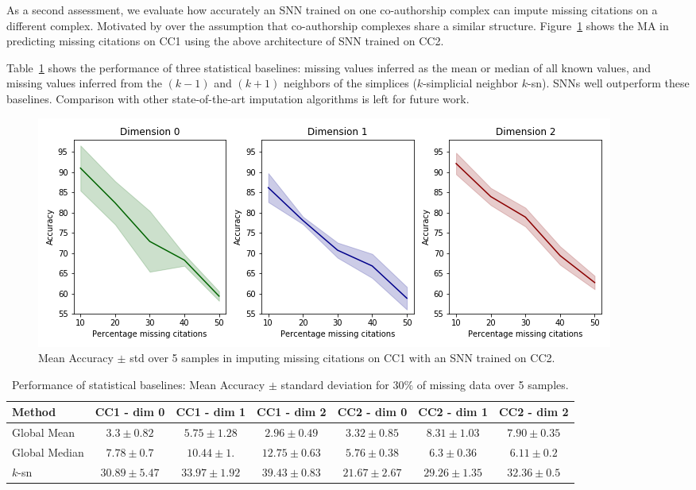 As a second assessment, we evaluate how accurately an SNN trained on one co-authorship complex can impute missing citations on a different complex.
Motivated by over the assumption that co-authorship complexes share a similar structure. 
Figure~\ref{fig:transfer-learning} shows the MA in predicting missing citations on CC1 using the above architecture of SNN trained on CC2.

Table~\ref{table:comparison-SNN} shows the performance of three statistical baselines: missing values inferred as the mean or median of all known values, and missing values inferred from the $(k-1)$ and $(k+1)$ neighbors of the simplices ($k$-simplicial neighbor $k$-sn).
SNNs well outperform these baselines.
Comparison with other state-of-the-art imputation algorithms is left for future work.

\begin{figure}[htbp]
  \centering
\includegraphics[scale=0.35]{./figures/accuracy_network1_pretrained.png}
  \caption{Mean Accuracy $\pm$ std over 5 samples in imputing missing citations on CC1 with an SNN trained on CC2.} \label{fig:transfer-learning}
\end{figure}

\begin{table}[htbp]
  \centering
  \scriptsize{
  \begin{tabular}{lcccccc}
    \toprule
    Method   & CC1 - dim 0   & CC1 - dim 1   & CC1 - dim 2   & CC2 - dim 0  & CC2 - dim 1  & CC2 - dim 2 \\
    \midrule
    Global Mean & $3.3 \pm 0.82$ & $5.75\pm 1.28$  &$ 2.96\pm 0.49$  & $3.32 \pm 0.85$ & $8.31 \pm 1.03$  & $7.90\pm 0.35$\\
    Global Median & $7.78 \pm 0.7$   & $10.44 \pm 1.$ &$ 12.75 \pm 0.63 $ & $5.76 \pm 0.38 $&$ 6.3\pm 0.36  $&$ 6.11\pm 0.2$\\
    $k$-sn & $30.89\pm 5.47 $& $33.97 \pm 1.92$ & $39.43 \pm 0.83  $& $21.67 \pm 2.67 $&$ 29.26\pm 1.35$   &$ 32.36 \pm 0.5 $\\
    \bottomrule
  \end{tabular}}
   \vspace{2pt}
  \caption{%
      Performance of statistical baselines: Mean Accuracy $\pm$ standard deviation for $30\%$ of missing data over 5 samples. 
  }\label{table:comparison-SNN}
\end{table}%
